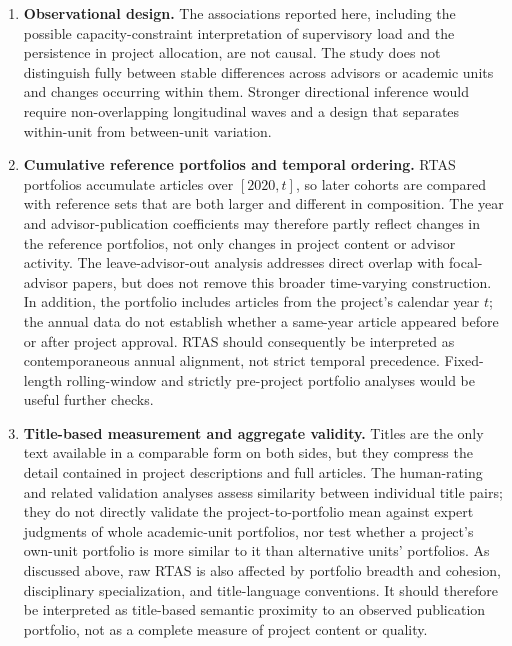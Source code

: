 \documentclass[pdflatex,sn-apa]{sn-jnl}
\begin{document}
\begin{enumerate}
\item \textbf{Observational design.} The associations reported here, including the possible capacity-constraint interpretation of supervisory load and the persistence in project allocation, are not causal. The study does not distinguish fully between stable differences across advisors or academic units and changes occurring within them. Stronger directional inference would require non-overlapping longitudinal waves and a design that separates within-unit from between-unit variation.

\item \textbf{Cumulative reference portfolios and temporal ordering.} RTAS portfolios accumulate articles over $[2020,t]$, so later cohorts are compared with reference sets that are both larger and different in composition. The year and advisor-publication coefficients may therefore partly reflect changes in the reference portfolios, not only changes in project content or advisor activity. The leave-advisor-out analysis addresses direct overlap with focal-advisor papers, but does not remove this broader time-varying construction. In addition, the portfolio includes articles from the project's calendar year $t$; the annual data do not establish whether a same-year article appeared before or after project approval. RTAS should consequently be interpreted as contemporaneous annual alignment, not strict temporal precedence. Fixed-length rolling-window and strictly pre-project portfolio analyses would be useful further checks.

\item \textbf{Title-based measurement and aggregate validity.} Titles are the only text available in a comparable form on both sides, but they compress the detail contained in project descriptions and full articles. The human-rating and related validation analyses assess similarity between individual title pairs; they do not directly validate the project-to-portfolio mean against expert judgments of whole academic-unit portfolios, nor test whether a project's own-unit portfolio is more similar to it than alternative units' portfolios. As discussed above, raw RTAS is also affected by portfolio breadth and cohesion, disciplinary specialization, and title-language conventions. It should therefore be interpreted as title-based semantic proximity to an observed publication portfolio, not as a complete measure of project content or quality.


\end{enumerate}
\end{document}
